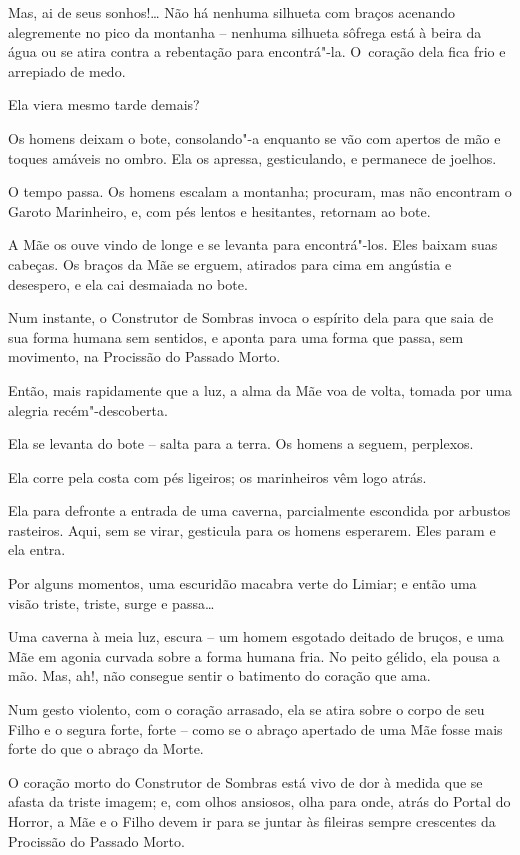 Mas, ai de seus sonhos!… Não há nenhuma silhueta com braços acenando
alegremente no pico da montanha -- nenhuma silhueta sôfrega está à
beira da água ou se atira contra a rebentação para encontrá"-la. O~coração dela fica frio e arrepiado de medo.

Ela viera mesmo tarde demais?

Os homens deixam o bote, consolando"-a enquanto se vão com apertos de mão
e toques amáveis no ombro. Ela os apressa, gesticulando, e permanece de
joelhos.

\smallskip
O tempo passa. Os homens escalam a montanha; procuram, mas não encontram
o Garoto Marinheiro, e, com pés lentos e hesitantes, retornam ao bote.

\smallskip
A Mãe os ouve vindo de longe e se levanta para encontrá"-los. Eles baixam
suas cabeças. Os braços da Mãe se erguem, atirados para cima em angústia
e desespero, e ela cai desmaiada no bote.

Num instante, o Construtor de Sombras invoca o espírito dela para que
saia de sua forma humana sem sentidos, e aponta para uma forma que
passa, sem movimento, na Procissão do Passado Morto.

Então, mais rapidamente que a luz, a alma da Mãe voa de volta, tomada
por uma alegria recém"-descoberta.

Ela se levanta do bote -- salta para a terra. Os homens a seguem,
perplexos.

Ela corre pela costa com pés ligeiros; os marinheiros vêm logo atrás.

Ela para defronte a entrada de uma caverna, parcialmente escondida por
arbustos rasteiros. Aqui, sem se virar, gesticula para os homens
esperarem. Eles param e ela entra.

\smallskip
Por alguns momentos, uma escuridão macabra verte do Limiar; e então uma
visão triste, triste, surge e passa…

Uma caverna à meia luz, escura -- um homem esgotado deitado de bruços, e
uma Mãe em agonia curvada sobre a forma humana fria. No peito gélido,
ela pousa a mão. Mas, ah!, não consegue sentir o batimento do coração
que ama.

Num gesto violento, com o coração arrasado, ela se atira sobre o corpo
de seu Filho e o segura forte, forte -- como se o abraço apertado de uma
Mãe fosse mais forte do que o abraço da Morte.

\smallskip
O coração morto do Construtor de Sombras está vivo de dor à medida que
se afasta da triste imagem; e, com olhos ansiosos, olha para onde, atrás
do Portal do Horror, a Mãe e o Filho devem ir para se juntar às fileiras
sempre crescentes da Procissão do Passado Morto.

